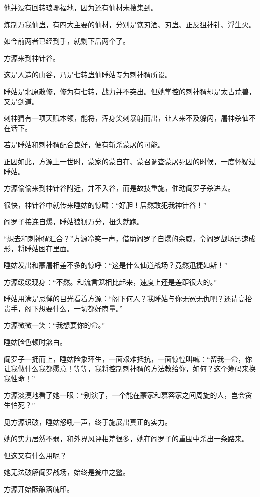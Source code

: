 \begin{this_body}
他并没有回转琅琊福地，因为还有仙材未搜集到。

炼制万我仙蛊，有四大主要的仙材，分别是饮刃酒、刃蛊、正反狙神针、浮生火。

如今前两者已经到手，就剩下后两个了。

方源来到神针谷。

这是人造的山谷，乃是七转蛊仙睡姑专为刺神猬所设。

睡姑是北原散修，修为有七转，战力并不突出。但她掌控的刺神猬却是太古荒兽，又是剑道。

刺神猬有一项天赋本领，能将，浑身尖刺暴射而出，让人来不及躲闪，屠神杀仙不在话下。

若是睡姑和刺神猬配合良好，便有斩杀蒙屠的可能。

正因如此，方源上一世时，蒙家的蒙自在、蒙召调查蒙屠死因的时候，一度怀疑过睡姑。

方源偷偷来到神针谷附近，并不入谷，而是故技重施，催动阎罗子杀进去。

很快，神针谷中就传来睡姑的惊啸：“好胆！居然敢犯我神针谷！”

阎罗子接连自爆，睡姑狼狈万分，扭头就跑。

“想去和刺神猬汇合？”方源冷笑一声，借助阎罗子自爆的余威，令阎罗战场迅速成形，将睡姑困在里面。

睡姑发出和蒙屠相差不多的惊呼：“这是什么仙道战场？竟然迅捷如斯！”

方源缓缓现身：“不然。和流言笼相比起来，速度上还是差距很大的。”

睡姑用满是忌惮的目光看着方源：“阁下何人？我睡姑与你无冤无仇吧？还请高抬贵手，阁下想要什么，一切都好商量。”

方源微微一笑：“我想要你的命。”

睡姑脸色顿时煞白。

阎罗子一拥而上，睡姑险象环生，一面艰难抵抗，一面惊惶叫喊：“留我一命，你让我做什么我都愿意！等等，我将控制刺神猬的方法教给你，如何？这个筹码来换我性命！”

方源淡漠地看了她一眼：“别演了，一个能在蒙家和慕容家之间周旋的人，岂会贪生怕死？”

见方源识破，睡姑怒吼一声，终于施展出真正的实力。

她的实力居然不弱，和外界风评相差很多，她在阎罗子的重围中杀出一条路来。

但这又有什么用呢？

她无法破解阎罗战场，始终是瓮中之鳖。

方源开始酝酿落魄印。


\end{this_body}
